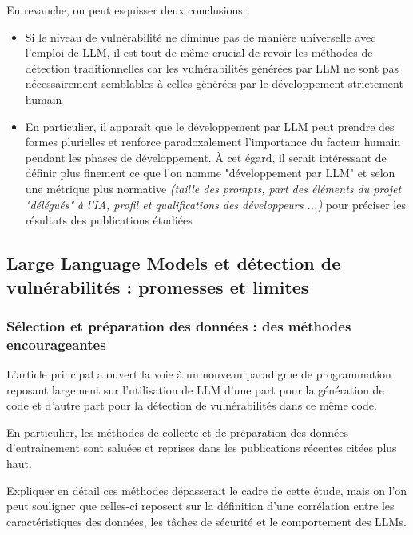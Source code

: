             En revanche, on peut esquisser deux conclusions :
            \begin{itemize}
                \item Si le niveau de vulnérabilité ne diminue pas de manière universelle avec
                l'emploi de LLM, il est tout de même crucial de revoir les méthodes de détection
                traditionnelles car les vulnérabilités générées par LLM ne sont pas nécessairement
                semblables à celles générées par le développement strictement humain
                \item En particulier, il apparaît que le développement par LLM peut prendre des
                formes plurielles et renforce paradoxalement l'importance du facteur humain pendant
                les phases de développement. À cet égard, il serait intéressant de définir plus
                finement ce que l'on nomme "développement par LLM" et selon une métrique plus
                normative
                \textit{(taille des prompts, part des éléments du projet "délégués" à l'IA, profil et qualifications des développeurs ...)}
                pour préciser les résultats des publications étudiées
        \end{itemize}

        \subsection{Large Language Models et détection de vulnérabilités : promesses et limites}

            \subsubsection{Sélection et préparation des données : des méthodes encourageantes}
                L'article principal a ouvert la voie à un nouveau paradigme de programmation
                reposant largement sur l'utilisation de LLM d'une part pour la génération de
                code et d'autre part pour la détection de vulnérabilités dans ce même code.

                En particulier, les méthodes de collecte et de préparation des données
                d'entraînement sont saluées et reprises dans les publications récentes citées
                plus haut.

                Expliquer en détail ces méthodes dépasserait le cadre de cette étude, mais on
                l'on peut souligner que celles-ci reposent sur la définition d'une corrélation
                entre les caractéristiques des données, les tâches de sécurité et le
                comportement des LLMs.
